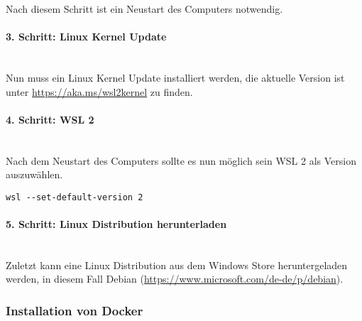 Nach diesem Schritt ist ein Neustart des Computers notwendig.

\paragraph{3. Schritt: Linux Kernel Update}\mbox{}\\
Nun muss ein Linux Kernel Update installiert werden, die aktuelle Version ist unter \url{https://aka.ms/wsl2kernel} zu finden.

\paragraph{4. Schritt: WSL 2}\mbox{}\\
Nach dem Neustart des Computers sollte es nun möglich sein WSL 2 als Version auszuwählen.
\begin{lstlisting}[caption={WSL 2 auswählen}, captionpos=b]
  wsl --set-default-version 2
\end{lstlisting}

\paragraph{5. Schritt: Linux Distribution herunterladen}\mbox{}\\
Zuletzt kann eine Linux Distribution aus dem Windows Store heruntergeladen werden, in diesem Fall Debian (\url{https://www.microsoft.com/de-de/p/debian}).

\subsubsection{Installation von Docker}
